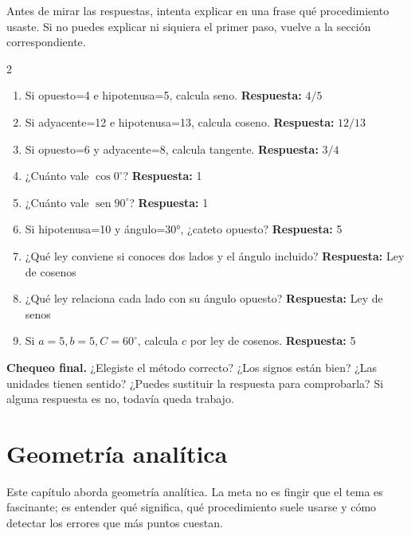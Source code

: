 \documentclass[10pt,oneside,openany]{book}
\newcommand{\sen}{\operatorname{sen}}\newcommand{\Prob}{\operatorname{P}}
\begin{document}
Antes de mirar las respuestas, intenta explicar en una frase qué procedimiento usaste. Si no puedes explicar ni siquiera el primer paso, vuelve a la sección correspondiente.

\begin{multicols}{2}\begin{enumerate}

\item Si opuesto=4 e hipotenusa=5, calcula seno. \textbf{Respuesta:} $4/5$

\item Si adyacente=12 e hipotenusa=13, calcula coseno. \textbf{Respuesta:} $12/13$

\item Si opuesto=6 y adyacente=8, calcula tangente. \textbf{Respuesta:} $3/4$

\item ¿Cuánto vale $\cos 0^\circ$? \textbf{Respuesta:} 1

\item ¿Cuánto vale $\sen90^\circ$? \textbf{Respuesta:} 1

\item Si hipotenusa=10 y ángulo=30°, ¿cateto opuesto? \textbf{Respuesta:} 5

\item ¿Qué ley conviene si conoces dos lados y el ángulo incluido? \textbf{Respuesta:} Ley de cosenos

\item ¿Qué ley relaciona cada lado con su ángulo opuesto? \textbf{Respuesta:} Ley de senos

\item Si $a=5,b=5,C=60^\circ$, calcula $c$ por ley de cosenos. \textbf{Respuesta:} 5

\end{enumerate}\end{multicols}

\begin{idea}\textbf{Chequeo final.} ¿Elegiste el método correcto? ¿Los signos están bien? ¿Las unidades tienen sentido? ¿Puedes sustituir la respuesta para comprobarla? Si alguna respuesta es no, todavía queda trabajo.\end{idea}



\chapter{Geometría analítica}

\begin{idea}
Este capítulo aborda geometría analítica. La meta no es fingir que el tema es fascinante; es entender qué significa, qué procedimiento suele usarse y cómo detectar los errores que más puntos cuestan.
\end{idea}
\end{document}
